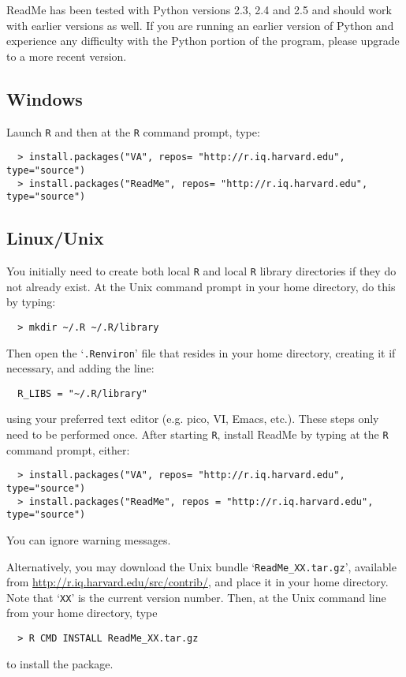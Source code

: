 \documentclass[oneside,letterpaper,titlepage]{article}
\begin{document}
ReadMe has been tested with Python versions 2.3, 2.4 and 2.5 and
should work with earlier versions as well. If you are running an
earlier version of Python and experience any difficulty with the
Python portion of the program, please upgrade to a more recent
version.

\subsection{Windows}

Launch \texttt{R} and then at the \texttt{R} command prompt, type:
\begin{verbatim}
  > install.packages("VA", repos= "http://r.iq.harvard.edu", type="source")
  > install.packages("ReadMe", repos= "http://r.iq.harvard.edu", type="source")
\end{verbatim}

\subsection{Linux/Unix}

You initially need to create both local \texttt{R} and local
\texttt{R} library directories if they do not already exist.  At the
Unix command prompt in your home directory, do this by typing:
  \begin{verbatim}
  > mkdir ~/.R ~/.R/library
  \end{verbatim}
Then open the `\texttt{.Renviron}' file that resides in your home
directory, creating it if necessary, and adding the line:
  \begin{verbatim}
  R_LIBS = "~/.R/library"
  \end{verbatim}
using your preferred text editor (e.g. pico, VI, Emacs, etc.).  These steps only need to be performed once.  After starting \texttt{R}, install ReadMe by typing
at the \texttt{R} command prompt, either:
\begin{verbatim}
  > install.packages("VA", repos= "http://r.iq.harvard.edu", type="source")
  > install.packages("ReadMe", repos = "http://r.iq.harvard.edu", type="source")
\end{verbatim}
You can ignore warning messages.  

Alternatively, you may download the Unix bundle
`\texttt{ReadMe\_XX.tar.gz}', available from
\url{http://r.iq.harvard.edu/src/contrib/}, and place it in your home
directory.  Note that `\texttt{XX}' is the current version number.
Then, at the Unix command line from your home directory, type
\begin{verbatim}
  > R CMD INSTALL ReadMe_XX.tar.gz
\end{verbatim}
to install the package.
\end{document}
